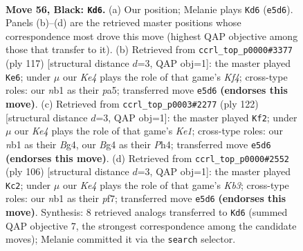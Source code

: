 \documentclass[11pt]{article}
\begin{document}
\clearpage

\begin{figure}[p]\centering
\begin{subfigure}{0.46\textwidth}\centering
\resizebox{\linewidth}{!}{%
\newchessgame
\chessboard[
  setfen={3B4/8/p7/4k3/2p3b1/8/5K2/1N6 b - - 11 56},
  showmover=false,
  pgfstyle=straightmove, color=movearrow, markmove={e5-d6}
]}
\caption{}
\end{subfigure}\hfill
\begin{subfigure}{0.46\textwidth}\centering
\resizebox{\linewidth}{!}{%
\newchessgame
\chessboard[
  setfen={8/8/p1bB4/P4k2/8/4K2p/8/8 b - - 1 59},
  showmover=false,
  pgfstyle=straightmove, color=movearrow, markmove={f5-e6}
]}
\caption{}
\end{subfigure}
\\[4pt]
\begin{subfigure}{0.46\textwidth}\centering
\resizebox{\linewidth}{!}{%
\newchessgame
\chessboard[
  setfen={8/8/5k2/1b6/5pBP/P7/8/4K3 w - - 3 62},
  showmover=false,
  pgfstyle=straightmove, color=movearrow, markmove={e1-f2}
]}
\caption{}
\end{subfigure}\hfill
\begin{subfigure}{0.46\textwidth}\centering
\resizebox{\linewidth}{!}{%
\newchessgame
\chessboard[
  setfen={8/5p2/5B2/3k4/8/1K6/3b1PP1/8 w - - 5 54},
  showmover=false,
  pgfstyle=straightmove, color=movearrow, markmove={b3-c2}
]}
\caption{}
\end{subfigure}
\caption{\textbf{Move 56, Black: \texttt{Kd6}.} (a) Our position; Melanie plays \texttt{Kd6} (\texttt{e5d6}). Panels (b)--(d) are the retrieved master positions whose correspondence most drove this move (highest QAP objective among those that transfer to it). (b) Retrieved from \texttt{ccrl\_top\_p0000\#3377} (ply 117) [structural distance $d$=3, QAP obj=1]: the master played \texttt{Ke6}; under $\mu$ our \emph{Ke4} plays the role of that game's \emph{Kf4}; cross-type roles: our \emph{n}b1 as their \emph{p}a5; transferred move \texttt{e5d6} \textbf{(endorses this move)}. (c) Retrieved from \texttt{ccrl\_top\_p0003\#2277} (ply 122) [structural distance $d$=3, QAP obj=1]: the master played \texttt{Kf2}; under $\mu$ our \emph{Ke4} plays the role of that game's \emph{Ke1}; cross-type roles: our \emph{n}b1 as their \emph{B}g4, our \emph{B}g4 as their \emph{P}h4; transferred move \texttt{e5d6} \textbf{(endorses this move)}. (d) Retrieved from \texttt{ccrl\_top\_p0000\#2552} (ply 106) [structural distance $d$=3, QAP obj=1]: the master played \texttt{Kc2}; under $\mu$ our \emph{Ke4} plays the role of that game's \emph{Kb3}; cross-type roles: our \emph{n}b1 as their \emph{p}f7; transferred move \texttt{e5d6} \textbf{(endorses this move)}. Synthesis: 8 retrieved analogs transferred to \texttt{Kd6} (summed QAP objective 7, the strongest correspondence among the candidate moves); Melanie committed it via the \texttt{search} selector.}
\label{fig:thought-m111}
\end{figure}
\end{document}
